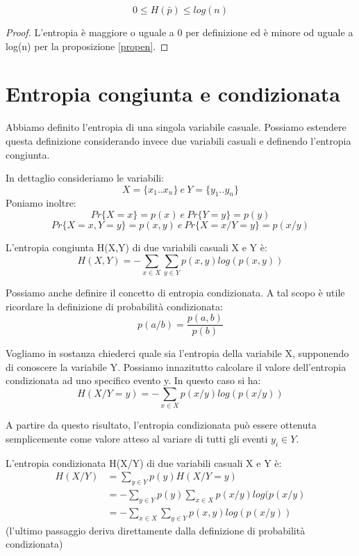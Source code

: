 \begin{proposizione}
 \[0 \le H(\bar{p}) \le log(n) \]

  \begin{proof}
   L'entropia è maggiore o uguale a 0 per definizione ed è 
   minore od uguale a log(n) per la proposizione \ref{propen}.
  \end{proof}
\end{proposizione}










\section{Entropia congiunta e condizionata}
Abbiamo definito l'entropia di una singola variabile casuale. Possiamo estendere questa definizione 
considerando invece due variabili casuali e definendo l'entropia congiunta.

In dettaglio consideriamo le variabili:
\[X=\{x_1..x_n\} \ e \ Y=\{y_1..y_n\}\]
Poniamo inoltre:
\[Pr\{X=x\}=p(x) \ e \ Pr\{Y=y\}=p(y) \]
\[Pr\{X=x,Y=y\}=p(x,y) \ e \ Pr\{X=x/Y=y\}=p(x/y) \]

\begin{definizione}
 L'entropia congiunta H(X,Y) di due variabili casuali X e Y è:
 \[ H(X,Y)=-\sum_{x \in X} \sum_{y \in Y} p(x,y)log( p(x,y) ) \]
\end{definizione}

Possiamo anche definire il concetto di entropia condizionata.
A tal scopo è utile ricordare la definizione di probabilità condizionata:
  \[ p(a/b)=\frac{p(a,b)}{p(b)} \]

Vogliamo in sostanza chiederci quale sia l'entropia della variabile X, supponendo di conoscere la variabile Y.
Possiamo innazitutto calcolare il valore dell'entropia condizionata ad uno specifico evento y.
In questo caso si ha:
\[
 H(X/Y=y)= -\sum_{x \in X} p(x/y)log(p(x/y))
\]

A partire da questo risultato, l'entropia condizionata può essere ottenuta semplicemente 
come valore atteso al variare di tutti gli eventi $y_i \in Y$.

\begin{definizione}
 L'entropia condizionata H(X/Y) di due variabili casuali X e Y è:
 \[
  \begin{split}
    H(X/Y) &=  \sum_{y \in Y}p(y)H(X/Y=y)  \\
         &= -\sum_{y \in Y} p(y) \sum_{x \in X} p(x/y)log(p(x/y) \\
         &= -\sum_{x \in X} \sum_{y \in Y} p(x,y)log( p(x/y) )
  \end{split}
  \]
 (l'ultimo passaggio deriva direttamente dalla definizione di probabilità condizionata)
\end{definizione}


